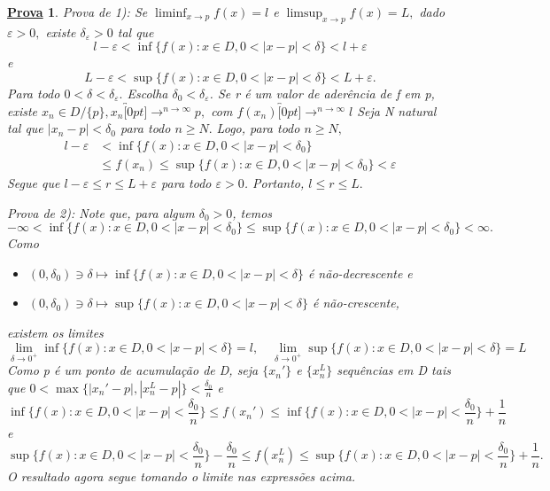 \documentclass{article}
\newtheorem*{proof*}{\underline{Prova}}
\begin{document}
\begin{proof*}
  Prova de 1): Se $\liminf_{x\to p}f(x) = l$ e $\limsup_{x\to p}f(x) = L,$ dado $\varepsilon > 0,$ existe $\delta_{\varepsilon}>0$
  tal que 
    $$
    l - \varepsilon < \inf{\{f(x):x\in D, 0<|x-p|<\delta\}} < l + \varepsilon
    $$
  e 
    $$
      L - \varepsilon < \sup{\{f(x):x\in D, 0<|x-p|<\delta\}} < L + \varepsilon.
    $$
  Para todo $0<\delta<\delta_{\varepsilon}.$ Escolha $\delta_{0} < \delta_{\varepsilon}$. Se r \'e um valor de ader\^encia
  de f em p, existe $x_{n}\in D/\{p\}, x_{n}\overbracket[0pt]{\longrightarrow}^{n\to \infty}p,$ com $f(x_{n})\overbracket[0pt]{\longrightarrow}^{n\to \infty}l$
  Seja N natural tal que $|x_{n}-p| < \delta_{0}$ para todo $n\geq{N}.$ Logo, para todo $n\geq{N},$
 \begin{align*}
   l - \varepsilon &< \inf\{f(x):x\in D, 0 < |x-p| < \delta_{0}\}\\
   &\leq{}f(x_{n})\leq{}\sup\{f(x):x\in D, 0 <|x-p|<\delta_{0}\} < \varepsilon
 \end{align*}
 Segue que $l-\varepsilon\leq{r}\leq{L+\varepsilon}$ para todo $\varepsilon > 0$. Portanto, $l\leq{r}\leq{L}.$

 Prova de 2): Note que, para algum $\delta_{0} > 0$, temos 
   $$
   -\infty < \inf{\{f(x):x\in D, 0 < |x-p|< \delta_{0}\}}\leq{}\sup\{f(x):x\in D, 0 < |x-p| <\delta_{0}\} < \infty.
   $$
   Como 
  \begin{itemize}
    \item $(0, \delta_{0})\ni\delta\mapsto\inf\{f(x):x\in D, 0<|x-p|<\delta\}$ \'e n\~ao-decrescente e 
    \item $(0, \delta_{0})\ni\delta\mapsto\sup\{f(x):x\in D, 0<|x-p|<\delta\}$ \'e n\~ao-crescente,
  \end{itemize}
  existem os limites 
    $$
    \lim_{\delta\to 0^{+}}\inf\{f(x):x\in D, 0 < |x-p| < \delta\} = l, \quad\lim_{\delta\to 0^{+}}\sup\{f(x):x\in D, 0 < |x-p| < \delta\} = L
    $$
    Como p \'e um ponto de acumula\c c\~ao de D, seja $\{x_{n}'\}$ e $\{x_{n}^{L}\}$ sequ\^encias em D tais que $0<\max\{|x_{n}'-p|, |x_{n}^{L}-p|\}<\frac{\delta_{0}}{n}$
    e 
      $$
      \inf{\{f(x):x\in D, 0 < |x-p| < \frac{\delta_{0}}{n}\}}\leq{f(x_{n}')}\leq{}\inf{\{f(x):x \in D, 0 <|x-p|<\frac{\delta_{0}}{n}\}} + \frac{1}{n}
      $$
    e
    $$
      \sup{\{f(x):x\in D, 0 < |x-p| < \frac{\delta_{0}}{n}\}}-\frac{\delta_{0}}{n}\leq{f(x_{n}^{L})}\leq{}\sup{\{f(x):x \in D, 0 <|x-p|<\frac{\delta_{0}}{n}\}} + \frac{1}{n}.
    $$
    O resultado agora segue tomando o limite nas express\~oes acima. 


\end{proof*}
\end{document}

